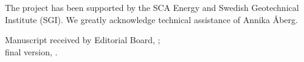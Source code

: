 \documentclass{amestyle}
\begin{document}
\begin{acknowledgements}
  The project has been supported by the SCA Energy and Swedish Geotechnical Institute (SGI). We greatly acknowledge technical assistance of Annika Åberg.
\end{acknowledgements}

\begin{receiptnote}
  Manuscript received by Editorial Board, \theamereceived; \\
  final version, \theameaccepted.
\end{receiptnote}





\end{document}
